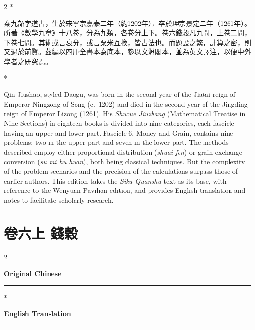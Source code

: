 \documentclass[11pt,a4paper]{article}
\newcommand{\switchCn}{\switchcolumn[0]*}
\newcommand{\switchEn}{\switchcolumn[1]*}
\begin{document}
\begin{paracol}{2}
\switchCn

秦九韶字道古，生於宋寧宗嘉泰二年（約1202年），卒於理宗景定二年（1261年）。所著《數學九章》十八卷，分為九類，各卷分上下。卷六錢穀凡九問，上卷二問，下卷七問。其術或言衰分，或言粟米互換，皆古法也。而題設之繁，計算之密，則又過於前賢。茲編以四庫全書本為底本，參以文淵閣本，並為英文譯注，以便中外學者之研究焉。

\switchEn

Qin Jiushao, styled Daogu, was born in the second year of the Jiatai reign of Emperor Ningzong of Song (c.\ 1202) and died in the second year of the Jingding reign of Emperor Lizong (1261). His \textit{Shuxue Jiuzhang} (Mathematical Treatise in Nine Sections) in eighteen books is divided into nine categories, each fascicle having an upper and lower part. Fascicle 6, Money and Grain, contains nine problems: two in the upper part and seven in the lower part. The methods described employ either proportional distribution (\textit{shuai fen}) or grain-exchange conversion (\textit{su mi hu huan}), both being classical techniques. But the complexity of the problem scenarios and the precision of the calculations surpass those of earlier authors. This edition takes the \textit{Siku Quanshu} text as its base, with reference to the Wenyuan Pavilion edition, and provides English translation and notes to facilitate scholarly research.

\end{paracol}

\newpage

\section*{\color{titlecolor}卷六上 \quad 錢穀}

\begin{paracol}{2}
\begin{center}
\textbf{\large\color{sectioncolor} Original Chinese}\\[0.3em]
\textcolor{rulecolor}{\rule{0.3\columnwidth}{0.3pt}}
\end{center}
\switchEn
\begin{center}
\textbf{\large\color{sectioncolor} English Translation}\\[0.3em]
\textcolor{rulecolor}{\rule{0.3\columnwidth}{0.3pt}}
\end{center}
\end{paracol}
\end{document}
